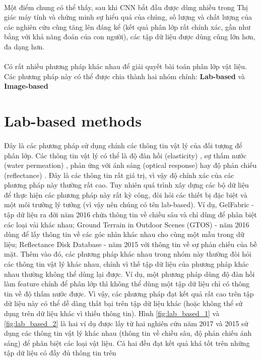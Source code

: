 \paragraph*{}
Một điểm chung có thể thấy, sau khi CNN bắt đầu được dùng nhiều trong Thị giác máy tính và chứng minh sự hiểu quả của chúng, số lượng và chất lượng của các nghiên cứu cũng tăng lên đáng kể (kết quả phân lớp rất chính xác, gần như bằng với khả năng đoán của con người), các tập dữ liệu được dùng cũng lớn hơn, đa dạng hơn.

\paragraph*{}
Có rất nhiều phương pháp khác nhau để giải quyết bài toán phân lớp vật liệu. Các phương pháp này có thể được chia thành hai nhóm chính: \textbf{Lab-based} và \textbf{Image-based}

\section{Lab-based methods}
\paragraph*{}
Đây là các phương pháp sử dụng chính các thông tin vật lý của đối tượng để phân lớp. Các thông tin vật lý có thể là độ đàn hồi (elasticity) \cite{davis2015visual}, sự thấm nước (water permeation) \cite{saponaro2015material}, phản ứng với ánh sáng (optical response) hay độ phản chiếu (reflectance) \cite{tanaka2017material}. Đây là các thông tin rất giá trị, vì vậy độ chính xác của các phương pháp này thường rất cao. Tuy nhiên quá trình xây dựng các bộ dữ liệu để thực hiện các phương pháp này rất kỳ công, đòi hỏi các thiết bị đặc biệt và một môi trường lý tưởng (vì vậy nên chúng có tên lab-based). Ví dụ, GelFabric \cite{yuan2017connecting} - tập dữ liệu ra đời năm 2016 chứa thông tin về chiều sâu và chỉ dùng để phân biệt các loại vải khác nhau; Ground Terrain in Outdoor Scenes (GTOS) \cite{xue2017differential} - năm 2016 dùng để lấy thông tin về các góc nhìn khác nhau cho cùng một mẫu trong dữ liệu; Reflectance Disk Database \cite{zhang2015reflectance} - năm 2015 với thông tin về sự phản chiếu của bề mặt. Thêm vào đó, các phương pháp khác nhau trong nhóm này thường đòi hỏi các thông tin vật lý khác nhau, chính vì thế tập dữ liệu của phương pháp khác nhau thường không thể dùng lại được. Ví dụ, một phương pháp dùng độ đàn hồi làm feature chính để phân lớp thì không thể dùng một tập dữ liệu chỉ có thông tin về độ thấm nước được. Vì vậy, các phương pháp đạt kết quả rất cao trên tập dữ liệu này có thể dễ dàng thất bại trên tập dữ liệu khác (hoặc không thể sử dụng trên dữ liệu khác vì thiếu thông tin). Hình \ref{fig:lab_based_1} và \ref{fig:lab_based_2} là hai ví dụ được lấy từ hai nghiên cứu năm 2017 và 2015 sử dụng các thông tin vật lý khác nhau (thông tin về chiều sâu, độ phản chiếu ánh sáng) để phân biệt các loại vật liệu. Cả hai đều đạt kết quả khá tốt trên những tập dữ liệu có đầy đủ thông tin trên \cite{tanaka2017material} \cite{zhang2015reflectance}

